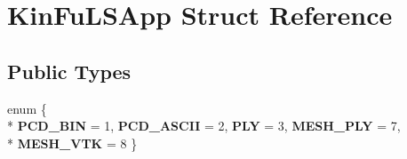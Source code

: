 \hypertarget{struct_kin_fu_l_s_app}{\section{Kin\+Fu\+L\+S\+App Struct Reference}
\label{struct_kin_fu_l_s_app}
}
\subsection*{Public Types}
\begin{DoxyCompactItemize}
\item 
\hypertarget{struct_kin_fu_l_s_app_a1bb8f10d28eb4883e70de1c1ae23270d}{enum \{ \\*
{\bfseries P\+C\+D\+\_\+\+B\+I\+N} = 1, 
{\bfseries P\+C\+D\+\_\+\+A\+S\+C\+I\+I} = 2, 
{\bfseries P\+L\+Y} = 3, 
{\bfseries M\+E\+S\+H\+\_\+\+P\+L\+Y} = 7, 
\\*
{\bfseries M\+E\+S\+H\+\_\+\+V\+T\+K} = 8
 \}}\label{struct_kin_fu_l_s_app_a1bb8f10d28eb4883e70de1c1ae23270d}

\end{DoxyCompactItemize}
